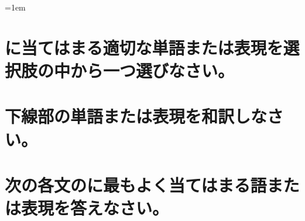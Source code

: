 \documentclass[a4paper]{ltjsarticle}
\begin{document}
\leftskip=1em

\section{\blank に当てはまる適切な単語または表現を選択肢の中から一つ選びなさい。}

\section{下線部の単語または表現を和訳しなさい。}\noindent
{}%
% 
% 
% 
% 
% 
% 
% 
% 
% 
% 
% 
% 
% 
% 
% 
% 
% 
% 
% 

\section{次の各文の\blank に最もよく当てはまる語または表現を答えなさい。}
% 
% 
% 
% 
% 
%
\addtocounter{correct}{-1}
\end{document}
